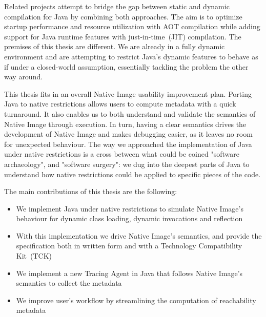 Related projects attempt to bridge the gap between static and dynamic compilation for Java by combining both approaches. The aim is to optimize startup performance and resource utilization with AOT compilation while adding support for Java runtime features with just-in-time~(JIT) compilation. The premises of this thesis are different. We are already in a fully dynamic environment and are attempting to restrict Java's dynamic features to behave as if under a closed-world assumption, essentially tackling the problem the other way around. 

This thesis fits in an overall Native Image usability improvement plan. Porting Java to native restrictions allows users to compute metadata with a quick turnaround. It also enables us to both understand and validate the semantics of Native Image through execution. In turn, having a clear semantics drives the development of Native Image and makes debugging easier, as it leaves no room for unexpected behaviour.
The way we approached the implementation of Java under native restrictions is a cross between what could be coined "software archaeology", and "software surgery": we dug into the deepest parts of Java to understand how native restrictions could be applied to specific pieces of the code.

The main contributions of this thesis are the following:
\begin{itemize}
  \item We implement Java under native restrictions to simulate Native Image's behaviour for dynamic class loading, dynamic invocations and reflection
  \item With this implementation we drive Native Image's semantics, and provide the specification both in written form and with a Technology Compatibility Kit~(TCK) 
  \item We implement a new Tracing Agent in Java that follows Native Image's semantics to collect the metadata 
  \item We improve user's workflow by streamlining the computation of reachability metadata
\end{itemize}